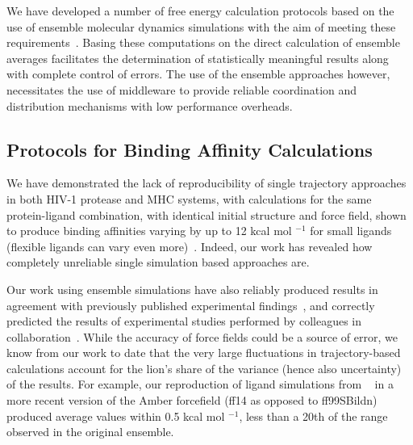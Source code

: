 \documentclass{bmcart}
\begin{document}
We have developed a number of free energy calculation protocols based on the
use of ensemble molecular dynamics simulations with the aim of meeting these
requirements~\cite{Sadiq2008, Sadiq2010, Wan2017brd4, Wan2017trk}. Basing
these computations on the direct calculation of ensemble averages facilitates
the determination of statistically meaningful results along with complete
control of errors. The use of the ensemble approaches however, necessitates
the use of middleware to provide reliable coordination and distribution
mechanisms with low performance overheads.


\subsection{Protocols for Binding Affinity Calculations}

We have demonstrated the lack of reproducibility of single trajectory
approaches in both HIV-1 protease and MHC systems, with calculations for the
same protein-ligand combination, with identical initial structure and force
field, shown to produce binding affinities varying by up to 12 kcal mol
$^{-1}$ for small ligands (flexible ligands can vary even
more)~\cite{Wan2015, Sadiq2010, Wright2014}. Indeed, our work has revealed
how completely unreliable single simulation based approaches are.

Our work using ensemble simulations have also reliably produced results in
agreement with previously published experimental findings~\cite{Sadiq2010,
Wan2011, Wright2014, Bhati2017, Wan2017brd4, Wan2017trk}, and correctly
predicted the results of experimental studies performed by colleagues in
collaboration~\cite{Bunney2015}. While the accuracy of force fields could be a
source of error, we know from our work to date that the very large
fluctuations in trajectory-based calculations account for the lion’s share of
the variance (hence also uncertainty) of the results.
For example, our reproduction of ligand simulations from ~\cite{Wan2017brd4} in 
a more recent version of the Amber forcefield (ff14 as opposed to ff99SBildn) 
produced average values within 0.5 kcal mol $^{-1}$, less than a 20th of the range observed in the original ensemble.
\end{document}
